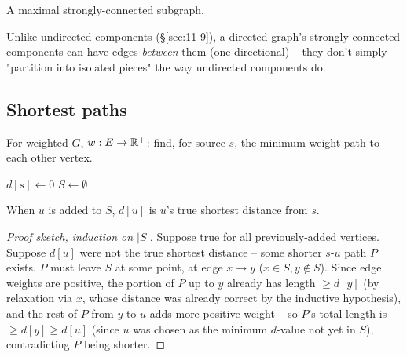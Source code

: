\documentclass[11pt]{article}
\begin{document}
\begin{definition}
A maximal strongly-connected subgraph.
\end{definition}

\begin{note}
Unlike undirected components (\S\ref{sec:11-9}), a directed graph's strongly connected components can have edges \emph{between} them (one-directional) -- they don't simply "partition into isolated pieces" the way undirected components do.
\end{note}

\subsection{Shortest paths}
\label{sec:11-9-4}

\begin{definition}
For weighted $G$, $w:E\to\mathbb{R}^+$: find, for source $s$, the minimum-weight path to each other vertex.
\end{definition}

\begin{algorithm}[H]
\SetAlgoLined
{}
$d[s]\gets0$\;
$S\gets\emptyset$\;
\caption{Dijkstra's algorithm}
\end{algorithm}

\begin{theorem}[Correctness]
When $u$ is added to $S$, $d[u]$ is $u$'s true shortest distance from $s$.
\end{theorem}
\begin{proof}[Proof sketch, induction on $|S|$]
Suppose true for all previously-added vertices. Suppose $d[u]$ were not the true shortest distance -- some shorter $s$-$u$ path $P$ exists. $P$ must leave $S$ at some point, at edge $x\to y$ ($x\in S, y\notin S$). Since edge weights are positive, the portion of $P$ up to $y$ already has length $\ge d[y]$ (by relaxation via $x$, whose distance was already correct by the inductive hypothesis), and the rest of $P$ from $y$ to $u$ adds more positive weight -- so $P$'s total length is $\ge d[y] \ge d[u]$ (since $u$ was chosen as the minimum $d$-value not yet in $S$), contradicting $P$ being shorter.
\end{proof}
\end{document}
